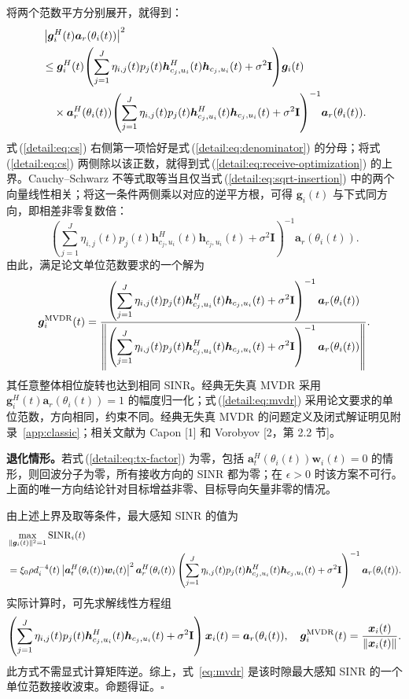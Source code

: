 \documentclass[11pt,a4paper]{ctexart}
\begin{document}
将两个范数平方分别展开，就得到：
\begin{align}
&\left|\bm g_i^H(t)\bm a_r(\theta_i(t))\right|^2\notag\\
&\le\bm g_i^H(t)\!\left(\sum_{j=1}^J\eta_{i,j}(t)p_j(t)
\bm h_{c_j,u_i}^{H}(t)\bm h_{c_j,u_i}(t)+\sigma^2\mathbf I\right)\!\bm g_i(t)\notag\\
&\quad\times\bm a_r^H(\theta_i(t))\!\left(\sum_{j=1}^J\eta_{i,j}(t)p_j(t)
\bm h_{c_j,u_i}^{H}(t)\bm h_{c_j,u_i}(t)+\sigma^2\mathbf I\right)^{-1}\!\bm a_r(\theta_i(t)).\label{detail:eq:cs}
\end{align}
式\,(\ref{detail:eq:cs}) 右侧第一项恰好是式\,(\ref{detail:eq:denominator}) 的分母；将式\,(\ref{detail:eq:cs}) 两侧除以该正数，就得到式\,(\ref{detail:eq:receive-optimization}) 的上界。Cauchy--Schwarz 不等式取等当且仅当式\,(\ref{detail:eq:sqrt-insertion}) 中的两个向量线性相关；将这一条件两侧乘以对应的逆平方根，可得 $\bm g_i(t)$ 与下式同方向，即相差非零复数倍：
\begin{equation}\label{detail:eq:direction}
\left(\sum_{j=1}^J\eta_{i,j}(t)p_j(t)
\bm h_{c_j,u_i}^{H}(t)\bm h_{c_j,u_i}(t)+\sigma^2\mathbf I\right)^{-1}
\bm a_r(\theta_i(t)).
\end{equation}
由此，满足论文单位范数要求的一个解为
\begin{equation}\label{detail:eq:mvdr}
\bm g_i^{\rm MVDR}(t)=
\frac{\left(\displaystyle\sum_{j=1}^J\eta_{i,j}(t)p_j(t)
\bm h_{c_j,u_i}^{H}(t)\bm h_{c_j,u_i}(t)+\sigma^2\mathbf I\right)^{-1}
\bm a_r(\theta_i(t))}
{\left\|\left(\displaystyle\sum_{j=1}^J\eta_{i,j}(t)p_j(t)
\bm h_{c_j,u_i}^{H}(t)\bm h_{c_j,u_i}(t)+\sigma^2\mathbf I\right)^{-1}
\bm a_r(\theta_i(t))\right\|}.
\end{equation}
其任意整体相位旋转也达到相同 SINR。经典无失真 MVDR 采用 $\bm g_i^H(t)\bm a_r(\theta_i(t))=1$ 的幅度归一化；式\,(\ref{detail:eq:mvdr}) 采用论文要求的单位范数，方向相同，约束不同。经典无失真 MVDR 的问题定义及闭式解证明见附录~\ref{app:classic}；相关文献为 Capon [1] 和 Vorobyov [2，第 2.2 节]。

\textbf{退化情形。}若式\,(\ref{detail:eq:tx-factor}) 为零，包括 $\bm a_t^H(\theta_i(t))\bm w_i(t)=0$ 的情形，则回波分子为零，所有接收方向的 SINR 都为零；在 $\epsilon>0$ 时该方案不可行。上面的唯一方向结论针对目标增益非零、目标导向矢量非零的情况。


由上述上界及取等条件，最大感知 SINR 的值为
\begin{align}\label{detail:eq:maximum-value}
&\max_{\|\bm g_i(t)\|^2=1}\operatorname{SINR}_i(t)\notag\\
&=\xi_0\rho d_i^{-4}(t)
\left|\bm a_t^H(\theta_i(t))\bm w_i(t)\right|^2
\bm a_r^H(\theta_i(t))
\left(\sum_{j=1}^J\eta_{i,j}(t)p_j(t)
\bm h_{c_j,u_i}^{H}(t)\bm h_{c_j,u_i}(t)
+\sigma^2\mathbf I\right)^{-1}\bm a_r(\theta_i(t)).
\end{align}
实际计算时，可先求解线性方程组
\begin{equation}\label{detail:eq:solve}
\left(\sum_{j=1}^J\eta_{i,j}(t)p_j(t)
\bm h_{c_j,u_i}^{H}(t)\bm h_{c_j,u_i}(t)
+\sigma^2\mathbf I\right)\bm x_i(t)=\bm a_r(\theta_i(t)),
\quad
\bm g_i^{\rm MVDR}(t)=\frac{\bm x_i(t)}{\|\bm x_i(t)\|}.
\end{equation}
此方式不需显式计算矩阵逆。综上，式~\eqref{eq:mvdr} 是该时隙最大感知 SINR 的一个单位范数接收波束。命题得证。\hfill$\square$
\end{document}

